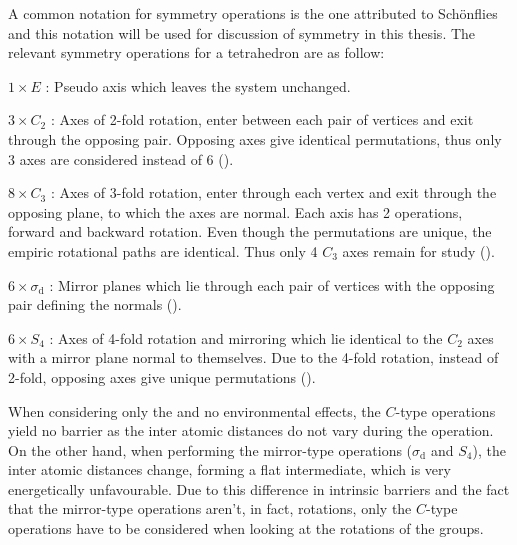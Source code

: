 A common notation for symmetry operations is the one attributed to Sch\"onflies~\cite{schonflies-notation-1889} and this notation will be used for discussion of symmetry in this thesis. %
The relevant symmetry operations for a tetrahedron are as follow:
\bit
\item $1 \times E$ : Pseudo axis which leaves the system unchanged.
\item $3 \times C_2$ : Axes of 2-fold rotation, enter between each pair of vertices and exit through the opposing pair.
Opposing axes give identical permutations, thus only 3 axes are considered instead of 6 ().
\item $8 \times C_3$ : Axes of 3-fold rotation, enter through each vertex and exit through the opposing plane, to which the axes are normal. Each axis has 2 operations, forward and backward rotation.
Even though the permutations are unique, the empiric rotational paths are identical.
Thus only 4 $C_3$ axes remain for study ().
\item $6 \times \sigma_\text{d}$ : Mirror planes which lie through each pair of vertices with the opposing pair defining the normals ().
\item $6 \times S_4$ : Axes of 4-fold rotation and mirroring which lie identical to the $C_2$ axes with a mirror plane normal to themselves. Due to the 4-fold rotation, instead of 2-fold, opposing axes give unique permutations ().
\eit

When considering only the  and no environmental effects, the $C$-type operations yield no barrier as the inter atomic distances do not vary during the operation.
On the other hand, when performing the mirror-type operations ($\sigma_\text{d}$ and $S_4$), the inter atomic distances change, forming a flat  intermediate, which is very energetically unfavourable.
Due to this difference in intrinsic barriers and the fact that the mirror-type operations aren't, in fact, rotations, only the $C$-type operations have to be considered when looking at the rotations of the  groups.
